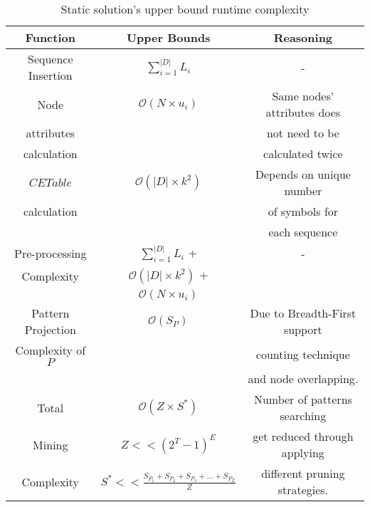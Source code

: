 \begin{table}[!t]
\centering
\begin{tabular}{|c|c|c|}
\hline
Function & Upper Bounds & Reasoning\\
\hline
Sequence Insertion &  $\sum_{i=1}^{|D|}L_{i}$ & -  \\ \hline
Node  & $\mathcal{O}(N \times u_{i})$ & Same nodes' attributes does\\ 
attributes & & not need to be \\
calculation & & calculated twice\\ 
\hline
$CETable$  & $\mathcal{O}(|D| \times k^{2})$ & Depends on unique number \\ 
calculation & & of symbols for\\
& & each sequence\\
\hline
Pre-processing & $\sum_{i=1}^{|D|}L_{i}$ +  & - \\ 
Complexity & $\mathcal{O}(|D| \times k^{2})$ + & \\ 
&  $\mathcal{O}(N \times u_{i})$ & \\ 
\hline 
Pattern Projection  & $\mathcal{O}(S_{P})$ & Due to Breadth-First support \\ 
Complexity of $P$ & & counting technique \\ 
& & and node overlapping.\\ 
\hline
Total  &  $\mathcal{O}(Z \times S^{*})$ & Number of patterns searching \\ 
Mining &  $Z << (2^{T}-1)^{E}$ & get reduced through applying \\ 
Complexity & $S^{*} << \frac{S_{P_{1}}+S_{P_{2}}+S_{P_{3}}+...+S_{P_{Z}}}{Z}$ & different pruning strategies.\\ 
\hline
\end{tabular}
\caption{Static solution's upper bound runtime complexity}
\label{table:runtime_complexity_tree_miner}
\end{table}

